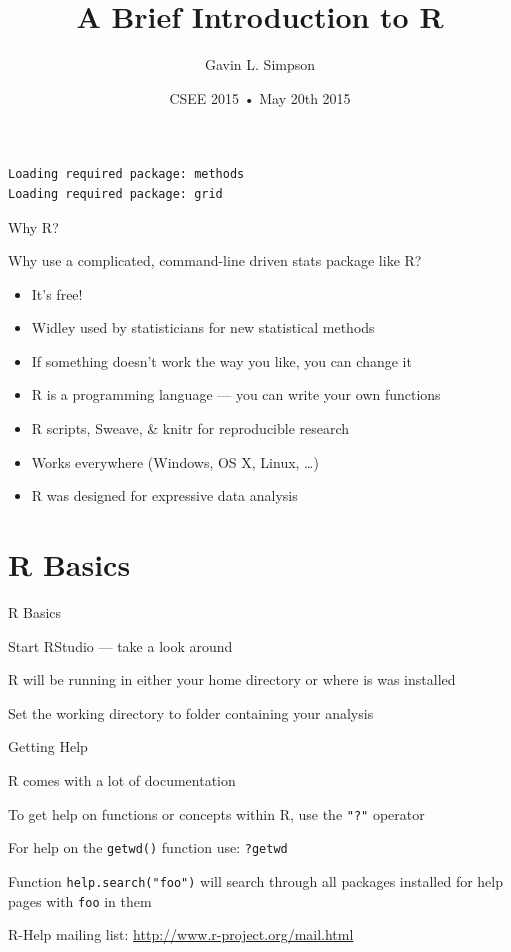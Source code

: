 \documentclass[10pt,ignorenonframetext,compress, aspectratio=169]{beamer}
\title{A Brief Introduction to R}
\author{Gavin L. Simpson}
\date{CSEE 2015 • May 20th 2015}
\begin{document}
\frame{\titlepage}

\begin{frame}[fragile]

\begin{verbatim}
Loading required package: methods
Loading required package: grid
\end{verbatim}

\end{frame}

\begin{frame}{Why R?}

Why use a complicated, command-line driven stats package like R?

\begin{itemize}
\itemsep1pt\parskip0pt
\item
  It's free!
\item
  Widley used by statisticians for new statistical methods
\item
  If something doesn't work the way you like, you can change it
\item
  R is a programming language --- you can write your own functions
\item
  R scripts, \alert{Sweave}, \& \alert{knitr} for reproducible research
\item
  Works everywhere (Windows, OS X, Linux, \ldots{})
\item
  R was designed for expressive data analysis
\end{itemize}

\end{frame}

\section{R Basics}\label{r-basics}

\begin{frame}{R Basics}

Start \alert{RStudio} --- take a look around

R will be running in either your home directory or where is was
installed

Set the working directory to folder containing your analysis

\end{frame}

\begin{frame}{Getting Help}

R comes with a lot of documentation

To get help on functions or concepts within R, use the \texttt{"?"}
operator

For help on the \texttt{getwd()} function use: \texttt{?getwd}

Function \texttt{help.search("foo")} will search through all packages
installed for help pages with \texttt{foo} in them

R-Help mailing list: \url{http://www.r-project.org/mail.html}

\end{frame}
\end{document}

